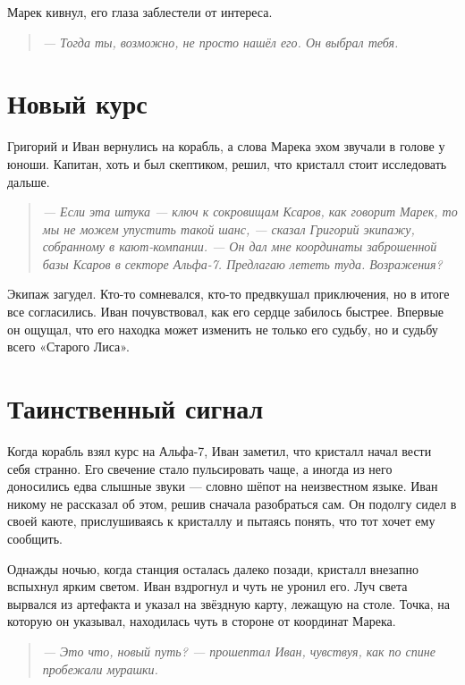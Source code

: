 \documentclass[12pt,a4paper]{book}
\newenvironment{dialogue}{\begin{quote}\itshape}{\end{quote}}
\begin{document}
Марек кивнул, его глаза заблестели от интереса.

\begin{dialogue}
--- Тогда ты, возможно, не просто нашёл его. Он выбрал тебя.
\end{dialogue}

\section*{Новый курс}

Григорий и Иван вернулись на корабль, а слова Марека эхом звучали в голове у юноши. Капитан, хоть и был скептиком, решил, что кристалл стоит исследовать дальше.

\begin{dialogue}
--- Если эта штука --- ключ к сокровищам Ксаров, как говорит Марек, то мы не можем упустить такой шанс, --- сказал Григорий экипажу, собранному в кают-компании. --- Он дал мне координаты заброшенной базы Ксаров в секторе Альфа-7. Предлагаю лететь туда. Возражения?
\end{dialogue}

Экипаж загудел. Кто-то сомневался, кто-то предвкушал приключения, но в итоге все согласились. Иван почувствовал, как его сердце забилось быстрее. Впервые он ощущал, что его находка может изменить не только его судьбу, но и судьбу всего «Старого Лиса».

\section*{Таинственный сигнал}

Когда корабль взял курс на Альфа-7, Иван заметил, что кристалл начал вести себя странно. Его свечение стало пульсировать чаще, а иногда из него доносились едва слышные звуки --- словно шёпот на неизвестном языке. Иван никому не рассказал об этом, решив сначала разобраться сам. Он подолгу сидел в своей каюте, прислушиваясь к кристаллу и пытаясь понять, что тот хочет ему сообщить.

Однажды ночью, когда станция осталась далеко позади, кристалл внезапно вспыхнул ярким светом. Иван вздрогнул и чуть не уронил его. Луч света вырвался из артефакта и указал на звёздную карту, лежащую на столе. Точка, на которую он указывал, находилась чуть в стороне от координат Марека.

\begin{dialogue}
--- Это что, новый путь? --- прошептал Иван, чувствуя, как по спине пробежали мурашки.
\end{dialogue}
\end{document}
